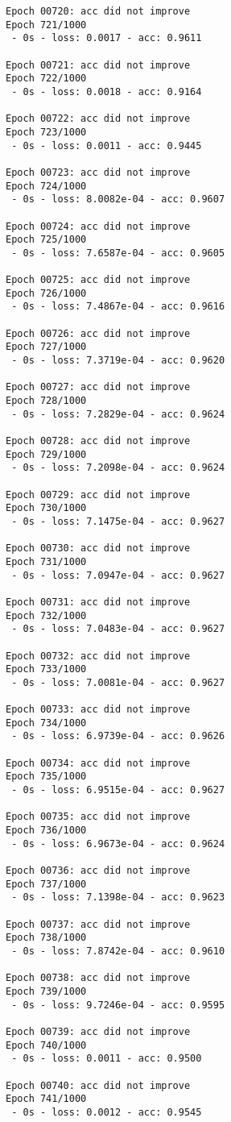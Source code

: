\documentclass[11pt]{article}
\begin{document}
\begin{Verbatim}[commandchars=\\\{\}]
Epoch 00720: acc did not improve
Epoch 721/1000
 - 0s - loss: 0.0017 - acc: 0.9611

Epoch 00721: acc did not improve
Epoch 722/1000
 - 0s - loss: 0.0018 - acc: 0.9164

Epoch 00722: acc did not improve
Epoch 723/1000
 - 0s - loss: 0.0011 - acc: 0.9445

Epoch 00723: acc did not improve
Epoch 724/1000
 - 0s - loss: 8.0082e-04 - acc: 0.9607

Epoch 00724: acc did not improve
Epoch 725/1000
 - 0s - loss: 7.6587e-04 - acc: 0.9605

Epoch 00725: acc did not improve
Epoch 726/1000
 - 0s - loss: 7.4867e-04 - acc: 0.9616

Epoch 00726: acc did not improve
Epoch 727/1000
 - 0s - loss: 7.3719e-04 - acc: 0.9620

Epoch 00727: acc did not improve
Epoch 728/1000
 - 0s - loss: 7.2829e-04 - acc: 0.9624

Epoch 00728: acc did not improve
Epoch 729/1000
 - 0s - loss: 7.2098e-04 - acc: 0.9624

Epoch 00729: acc did not improve
Epoch 730/1000
 - 0s - loss: 7.1475e-04 - acc: 0.9627

Epoch 00730: acc did not improve
Epoch 731/1000
 - 0s - loss: 7.0947e-04 - acc: 0.9627

Epoch 00731: acc did not improve
Epoch 732/1000
 - 0s - loss: 7.0483e-04 - acc: 0.9627

Epoch 00732: acc did not improve
Epoch 733/1000
 - 0s - loss: 7.0081e-04 - acc: 0.9627

Epoch 00733: acc did not improve
Epoch 734/1000
 - 0s - loss: 6.9739e-04 - acc: 0.9626

Epoch 00734: acc did not improve
Epoch 735/1000
 - 0s - loss: 6.9515e-04 - acc: 0.9627

Epoch 00735: acc did not improve
Epoch 736/1000
 - 0s - loss: 6.9673e-04 - acc: 0.9624

Epoch 00736: acc did not improve
Epoch 737/1000
 - 0s - loss: 7.1398e-04 - acc: 0.9623

Epoch 00737: acc did not improve
Epoch 738/1000
 - 0s - loss: 7.8742e-04 - acc: 0.9610

Epoch 00738: acc did not improve
Epoch 739/1000
 - 0s - loss: 9.7246e-04 - acc: 0.9595

Epoch 00739: acc did not improve
Epoch 740/1000
 - 0s - loss: 0.0011 - acc: 0.9500

Epoch 00740: acc did not improve
Epoch 741/1000
 - 0s - loss: 0.0012 - acc: 0.9545


\end{Verbatim}
\end{document}
